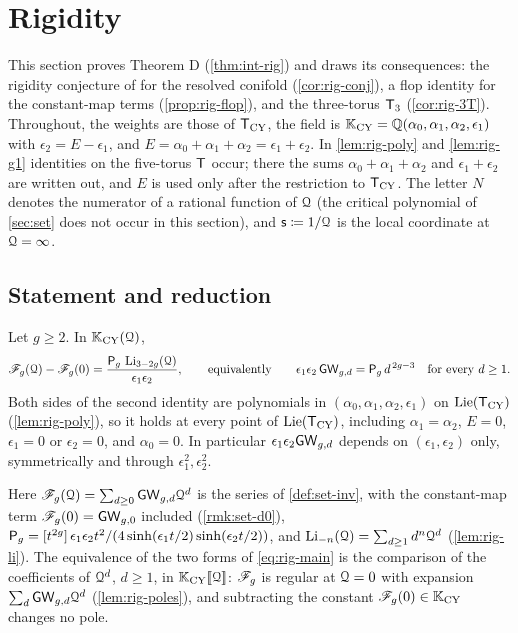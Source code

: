 \section{Rigidity}
\label{sec:rig}

This section proves Theorem D (\cref{thm:int-rig}) and draws its consequences: the rigidity conjecture of \cite{BS} for the resolved conifold (\cref{cor:rig-conj}), a flop identity for the constant-map terms (\cref{prop:rig-flop}), and the three-torus $\mathsf{T}_{3}$ (\cref{cor:rig-3T}). Throughout, the weights are those of $\mathsf{T}_{\mathrm{CY}}$, the field is $\mathbb{K}_{\mathrm{CY}}=\mathbb{Q}(\alpha_0,\alpha_1,\alpha_2,\epsilon_1)$ with $\epsilon_2=E-\epsilon_1$, and $E=\alpha_0+\alpha_1+\alpha_2=\epsilon_1+\epsilon_2$. In \cref{lem:rig-poly} and \cref{lem:rig-g1} identities on the five-torus $\mathsf{T}$ occur; there the sums $\alpha_0+\alpha_1+\alpha_2$ and $\epsilon_1+\epsilon_2$ are written out, and $E$ is used only after the restriction to $\mathsf{T}_{\mathrm{CY}}$. The letter $N$ denotes the numerator of a rational function of $\mathcal{Q}$ (the critical polynomial of \cref{sec:set} does not occur in this section), and $\mathsf{s}\coloneqq 1/\mathcal{Q}$ is the local coordinate at $\mathcal{Q}=\infty$.

\subsection{Statement and reduction}
\label{sec:rig-plan}

\begin{thm}
\label{thm:rig-main}
Let $g\geq 2$. In $\mathbb{K}_{\mathrm{CY}}(\mathcal{Q})$,
\begin{equation}
\label{eq:rig-main}
\mathscr{F}_g(\mathcal{Q})-\mathscr{F}_g(0)=\frac{\mathsf{P}_{g}\,\operatorname{Li}_{3-2g}(\mathcal{Q})}{\epsilon_1\epsilon_2},
\qquad\text{equivalently}\qquad
\epsilon_1\epsilon_2\,\mathsf{GW}_{g,d}=\mathsf{P}_{g}\,d^{\,2g-3}\quad\text{for every } d\geq 1 .
\end{equation}
Both sides of the second identity are polynomials in $(\alpha_0,\alpha_1,\alpha_2,\epsilon_1)$ on $\mathrm{Lie}(\mathsf{T}_{\mathrm{CY}})$ (\cref{lem:rig-poly}), so it holds at every point of $\mathrm{Lie}(\mathsf{T}_{\mathrm{CY}})$, including $\alpha_1=\alpha_2$, $E=0$, $\epsilon_1=0$ or $\epsilon_2=0$, and $\alpha_0=0$. In particular $\epsilon_1\epsilon_2\mathsf{GW}_{g,d}$ depends on $(\epsilon_1,\epsilon_2)$ only, symmetrically and through $\epsilon_1^2,\epsilon_2^2$.
\end{thm}

Here $\mathscr{F}_g(\mathcal{Q})=\sum_{d\geq 0}\mathsf{GW}_{g,d}\mathcal{Q}^d$ is the series of \cref{def:set-inv}, with the constant-map term $\mathscr{F}_g(0)=\mathsf{GW}_{g,0}$ included (\cref{rmk:set-d0}), $\mathsf{P}_{g}=[t^{2g}]\,\epsilon_1\epsilon_2t^2/(4\sinh(\epsilon_1t/2)\sinh(\epsilon_2t/2))$, and $\operatorname{Li}_{-n}(\mathcal{Q})=\sum_{d\geq 1}d^n\mathcal{Q}^d$ (\cref{lem:rig-li}). The equivalence of the two forms of \eqref{eq:rig-main} is the comparison of the coefficients of $\mathcal{Q}^d$, $d\geq 1$, in $\mathbb{K}_{\mathrm{CY}}[\![ \mathcal{Q} ]\!]$: $\mathscr{F}_g$ is regular at $\mathcal{Q}=0$ with expansion $\sum_d\mathsf{GW}_{g,d}\mathcal{Q}^d$ (\cref{lem:rig-poles}), and subtracting the constant $\mathscr{F}_g(0)\in\mathbb{K}_{\mathrm{CY}}$ changes no pole.

